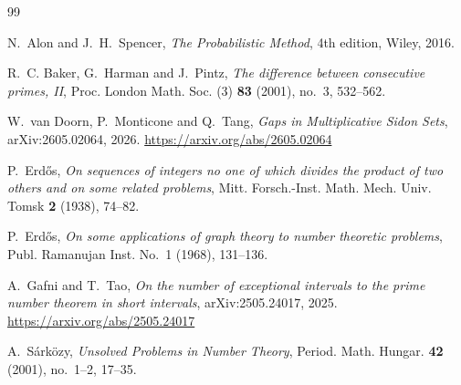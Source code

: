 \documentclass[11pt,reqno]{amsart}
\numberwithin{equation}{section}
\theoremstyle{plain}
\theoremstyle{definition}
\begin{document}
\begin{thebibliography}{99}

N.~Alon and J.~H.~Spencer,
\emph{The Probabilistic Method},
4th edition, Wiley, 2016.

R.~C. Baker, G.~Harman and J.~Pintz,
\emph{The difference between consecutive primes, II},
Proc. London Math. Soc. (3) \textbf{83} (2001), no.~3, 532--562.


W.~van Doorn, P.~Monticone and Q.~Tang,
\emph{Gaps in Multiplicative Sidon Sets},
arXiv:2605.02064, 2026.
\url{https://arxiv.org/abs/2605.02064}

P.~Erd\H{o}s,
\emph{On sequences of integers no one of which divides the product of two others
and on some related problems},
Mitt. Forsch.-Inst. Math. Mech. Univ. Tomsk \textbf{2} (1938), 74--82.

P.~Erd\H{o}s,
\emph{On some applications of graph theory to number theoretic problems},
Publ. Ramanujan Inst. No.~1 (1968), 131--136.

A.~Gafni and T.~Tao,
\emph{On the number of exceptional intervals to the prime number theorem in short intervals},
arXiv:2505.24017, 2025.
\url{https://arxiv.org/abs/2505.24017}

A.~S\'ark\"ozy,
\emph{Unsolved Problems in Number Theory},
Period. Math. Hungar. \textbf{42} (2001), no.~1--2, 17--35.

\end{thebibliography}
\end{document}
